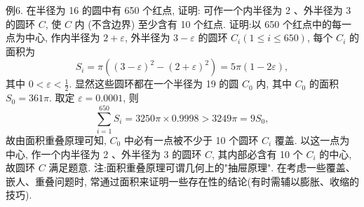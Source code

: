 例6. 在半径为 16 的圆中有 650 个红点, 证明: 可作一个内半径为 2 、外半径为 3 的圆环 $C$, 使 $C$ 内 (不含边界) 至少含有 10 个红点.
证明:以 650 个红点中的每一点为中心, 作内半径为 $2+\varepsilon$, 外半径为 $3- \varepsilon$ 的圆环 $C_i(1 \leqslant i \leqslant 650)$, 每个 $C_i$ 的面积为
$$
S_i=\pi\left((3-\varepsilon)^2-(2+\varepsilon)^2\right)=5 \pi(1-2 \varepsilon),
$$
其中 $0<\varepsilon<\frac{1}{2}$.
显然这些圆环都在一个半径为 19 的圆 $C_0$ 内, 其中 $C_0$ 的面积 $S_0=361 \pi$.
取定 $\varepsilon=0.0001$, 则
$$
\sum_{i=1}^{650} S_i=3250 \pi \times 0.9998>3249 \pi=9 S_0,
$$
故由面积重叠原理可知, $C_0$ 中必有一点被不少于 10 个圆环 $C_i$ 覆盖.
以这一点为中心, 作一个内半径为 2 、外半径为 3 的圆环 $C$, 其内部必含有 10 个 $C_i$ 的中心, 故圆环 $C$ 满足题意.
注:面积重叠原理可谓几何上的"抽屉原理". 在考虑一些覆盖、嵌人、重叠问题时, 常通过面积来证明一些存在性的结论(有时需辅以膨胀、收缩的技巧).




